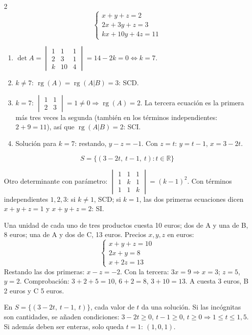 \documentclass[10pt]{article}
\begin{document}
\begin{multicols}{2}
\[\begin{cases}x+y+z=2\\2x+3y+z=3\\kx+10y+4z=11\end{cases}\]
\begin{enumerate}
  \item \(\det A=\begin{vmatrix}1&1&1\\2&3&1\\k&10&4\end{vmatrix}=14-2k=0\iff k=7\).
  \item \(k\ne7\): \(\operatorname{rg}(A)=\operatorname{rg}(A|B)=3\): SCD.
  \item \(k=7\): \(\begin{vmatrix}1&1\\2&3\end{vmatrix}=1\ne0\Rightarrow\operatorname{rg}(A)=2\). La tercera ecuación es la primera más tres veces la segunda (también en los términos independientes: \(2+9=11\)), así que \(\operatorname{rg}(A|B)=2\): SCI.
  \item Solución para \(k=7\): restando, \(y-z=-1\). Con \(z=t\): \(y=t-1\), \(x=3-2t\).
\end{enumerate}
\[S=\{(3-2t,\ t-1,\ t):t\in\mathbb R\}\]
\begin{ejemplo}
Otro determinante con parámetro: \(\begin{vmatrix}1&1&1\\1&k&1\\1&1&k\end{vmatrix}=(k-1)^2\). Con términos independientes \(1,2,3\): si \(k\ne1\), SCD; si \(k=1\), las dos primeras ecuaciones dicen \(x+y+z=1\) y \(x+y+z=2\): SI.
\end{ejemplo}

Una unidad de cada uno de tres productos cuesta 10 euros; dos de A y una de B, 8 euros; una de A y dos de C, 13 euros. Precios \(x,y,z\) en euros:
\[\begin{cases}x+y+z=10\\2x+y=8\\x+2z=13\end{cases}\]
Restando las dos primeras: \(x-z=-2\). Con la tercera: \(3x=9\Rightarrow x=3\); \(z=5\), \(y=2\). Comprobación: \(3+2+5=10\), \(6+2=8\), \(3+10=13\). A cuesta 3 euros, B 2 euros y C 5 euros.

En \(S=\{(3-2t,\ t-1,\ t)\}\), cada valor de \(t\) da una solución. Si las incógnitas son cantidades, se añaden condiciones: \(3-2t\ge0\), \(t-1\ge0\), \(t\ge0\Rightarrow1\le t\le1{,}5\). Si además deben ser enteras, solo queda \(t=1\): \((1,0,1)\).


\end{multicols}
\end{document}
